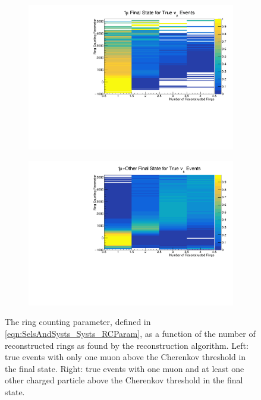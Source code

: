 \begin{figure}[h]
  \begin{subfigure}[t]{0.49\textwidth}
    \includegraphics[width=\textwidth, trim={0mm 0mm 0mm 0mm}, clip,page=1]{Figures/Selections/NuFlavour_14_Top_1.pdf}
  \end{subfigure}%
  \begin{subfigure}[t]{0.49\textwidth}
    \includegraphics[width=\textwidth, trim={0mm 0mm 0mm 0mm}, clip,page=1]{Figures/Selections/NuFlavour_14_Top_3.pdf}
  \end{subfigure}
  \caption{The ring counting parameter, defined in \autoref{eqn:SelsAndSysts_Systs_RCParam}, as a function of the number of reconstructed rings as found by the \fq reconstruction algorithm. Left: true \quickmath{\nu_{\mu}} events with only one muon above the Cherenkov threshold in the final state. Right: true \quickmath{\nu_{\mu}} events with one muon and at least one other charged particle above the Cherenkov threshold in the final state.}
  \label{fig:SelsAndSysts_RCMaps}
\end{figure}


